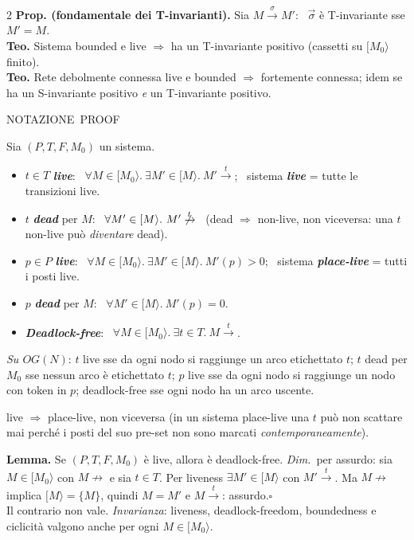 \documentclass[8pt,a4paper]{extarticle}
\newcommand{\NOT}{\colorbox{black!12}{\scriptsize\textsf{NOTAZIONE}}}
\newcommand{\PRF}{\colorbox{pf!20}{\scriptsize\textsf{PROOF}}}
\newcommand{\topic}[2]{%
  \Needspace*{5\baselineskip}%
  \vspace{4pt}\noindent{\color{tit}\bfseries #1}\hfill #2\par
  \vspace{0pt}{\color{tit}\rule{\linewidth}{0.7pt}}\par\vspace{1.5pt}}
\newcommand{\D}[1]{\textbf{\textit{#1}}}
\newcommand{\pf}{{\color{pf}\itshape Dim.}~}
\newcommand{\sq}{\hfill\ensuremath{\square}}
\begin{document}
\begin{multicols*}{2}
\textbf{Prop. (fondamentale dei T-invarianti).} Sia $M\xrightarrow{\sigma}M'$: \ $\vec{\sigma}$ è T-invariante sse $M'=M$.\\
\textbf{Teo.} Sistema bounded e live $\Rightarrow$ ha un T-invariante positivo (cassetti su $[M_0\rangle$ finito).\\
\textbf{Teo.} Rete debolmente connessa live e bounded $\Rightarrow$ fortemente connessa; idem se ha un S-invariante positivo \emph{e} un T-invariante positivo.

\topic{4. Liveness e Place-Liveness}{\NOT\ \PRF}
Sia $(P,T,F,M_0)$ un sistema.
\begin{itemize}
\item $t\in T$ \D{live}: \ $\forall M\in[M_0\rangle.\ \exists M'\in[M\rangle.\ M'\xrightarrow{t}$; \ sistema \D{live} = tutte le transizioni live.
\item $t$ \D{dead} per $M$: \ $\forall M'\in[M\rangle.\ M'\not\xrightarrow{t}$ \ (dead $\Rightarrow$ non-live, non viceversa: una $t$ non-live può \emph{diventare} dead).
\item $p\in P$ \D{live}: \ $\forall M\in[M_0\rangle.\ \exists M'\in[M\rangle.\ M'(p)>0$; \ sistema \D{place-live} = tutti i posti live.
\item $p$ \D{dead} per $M$: \ $\forall M'\in[M\rangle.\ M'(p)=0$.
\item \D{Deadlock-free}: \ $\forall M\in[M_0\rangle.\ \exists t\in T.\ M\xrightarrow{t}$.
\end{itemize}
\emph{Su $OG(N)$}: $t$ live sse da ogni nodo si raggiunge un arco etichettato $t$; $t$ dead per $M_0$ sse nessun arco è etichettato $t$; $p$ live sse da ogni nodo si raggiunge un nodo con token in $p$; deadlock-free sse ogni nodo ha un arco uscente.

live $\Rightarrow$ place-live, non viceversa (in un sistema place-live una $t$ può non scattare mai perché i posti del suo pre-set non sono marcati \emph{contemporaneamente}).

\textbf{Lemma.} Se $(P,T,F,M_0)$ è live, allora è deadlock-free.
\pf per assurdo: sia $M\in[M_0\rangle$ con $M\not\rightarrow$ e sia $t\in T$. Per liveness $\exists M'\in[M\rangle$ con $M'\xrightarrow{t}$. Ma $M\not\rightarrow$ implica $[M\rangle=\{M\}$, quindi $M=M'$ e $M\xrightarrow{t}$: assurdo.\sq\\
Il contrario non vale. \emph{Invarianza}: liveness, deadlock-freedom, boundedness e ciclicità valgono anche per ogni $M\in[M_0\rangle$.


\end{multicols*}
\end{document}
